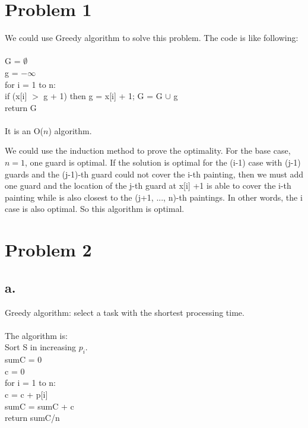 \documentclass[twoside,11pt]{homework}
\begin{document}
\maketitle

\section*{Problem 1}
We could use Greedy algorithm to solve this problem.
The code is like following:
\\\\
G = $\emptyset$\\
g = $-\infty$\\
for i = 1 to n:\\
\hspace*{8mm}	if (x[i] $>$ g + 1) then {g = x[i] + 1; G = G $\cup$ g}\\
return G
\\\\
It is an O($n$) algorithm.

We could use the induction method to prove the optimality.
For the base case, $n=1$, one guard is optimal.
If the solution is optimal for the (i-1) case with (j-1) guards and the (j-1)-th guard could not cover the i-th painting, then we must add one guard and the location of the j-th guard at x[i] +1 is able to cover the i-th painting while is also closest to the (j+1, ..., n)-th paintings.
In other words, the i case is also optimal.
So this algorithm is optimal.

\section*{Problem 2}
\subsection*{a.}
Greedy algorithm: select a task with the shortest processing time.
\\\\
The algorithm is:
\\
Sort S in increasing $p_i$.\\
sumC = 0\\
c = 0\\
for i = 1 to n:\\
\hspace*{8mm}	c = c + p[i]\\
\hspace*{8mm} sumC = sumC + c \\
return sumC/n \\
\end{document}
